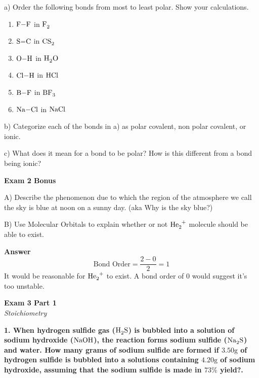 \documentclass{article}
\begin{document}
    a) Order the following bonds from most to least polar. Show your calculations.
    \begin{enumerate}
        \item $\ce{F-F}$ in $\ce{F2}$
        \item $\ce{S=C}$ in $\ce{CS2}$
        \item $\ce{O-H}$ in $\ce{H2O}$
        \item $\ce{Cl-H}$ in $\ce{HCl}$
        \item $\ce{B-F}$ in $\ce{BF3}$
        \item $\ce{Na-Cl}$ in $\ce{NaCl}$
    \end{enumerate}

    b)  Categorize each of the bonds in a) as polar covalent, non polar covalent, or ionic.

    c) What does it mean for a bond to be polar? How is this different from a bond being ionic?
    \pagebreak

    \begin{center}
        \textbf{Exam 2 Bonus}\\
    \end{center}

    A) Describe the phenomenon due to which the region of the atmosphere we call the sky is blue at noon on a sunny day. (aka Why is the sky blue?)

    B) Use Molecular Orbitals to explain whether or not $\ce{He2+}$ molecule should be able to exist.

    \textbf{Answer}\\
    $$\text{Bond Order} = \dfrac{2 - 0}{2} = 1$$
    It would be reasonable for $\ce{He2+}$ to exist. A bond order of 0 would suggest it's too unstable.

    \pagebreak


    \begin{center}
        \textbf{Exam 3 Part 1}\\
        \textit{Stoichiometry}
    \end{center}
    \textbf{1. When hydrogen sulfide gas ($\ce{H2S}$) is bubbled into a solution of sodium hydroxide ($\ce{NaOH}$), the reaction forms sodium sulfide ($\ce{Na2S}$) and water. How many grams of sodium sulfide are formed if $3.50 \si{\gram}$ of hydrogen sulfide is bubbled into a solutions containing $4.20 \si{\gram}$ of sodium hydroxide, assuming that the sodium sulfide is made in $73\%$ yield?.}
\end{document}
